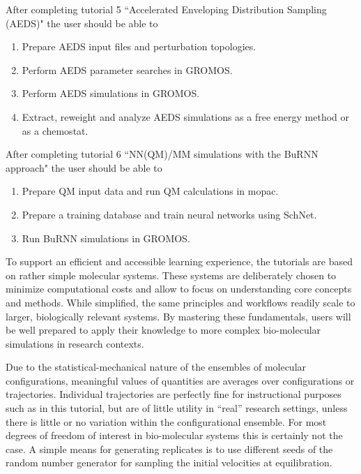 %
After completing tutorial 5 ``Accelerated Enveloping Distribution Sampling (AEDS)" the user should be able to
\begin{enumerate}
\item Prepare AEDS input files and perturbation topologies.
\item Perform AEDS parameter searches in GROMOS.
\item Perform AEDS simulations in GROMOS.
\item Extract, reweight and analyze AEDS simulations as a free energy method or as a chemostat.
\end{enumerate}
%
After completing tutorial 6 “NN(QM)/MM simulations with the BuRNN approach" the user should be able to
\begin{enumerate}
\item Prepare QM input data and run QM calculations in mopac.
\item Prepare a training database and train neural networks using SchNet.
\item Run BuRNN simulations in GROMOS.
\end{enumerate}
%

To support an efficient and accessible learning experience, the tutorials are based on rather simple molecular systems. These systems are deliberately chosen to minimize computational costs and allow to focus on understanding core concepts and methods. While simplified, the same principles and workflows readily scale to larger, biologically relevant systems. By mastering these fundamentals, users will be well prepared to apply their knowledge to more complex bio-molecular simulations in research contexts.

Due to the statistical-mechanical nature of the ensembles of molecular configurations, meaningful values of quantities are averages over configurations or trajectories. Individual trajectories are perfectly fine for instructional purposes such as in this tutorial, but are of little utility in ``real'' research settings, unless there is little or no variation within the configurational ensemble. 
For most degrees of freedom of interest in bio-molecular systems this is certainly not the case. A simple means for generating replicates is to use different seeds of the random number generator for sampling the initial velocities at equilibration. 



